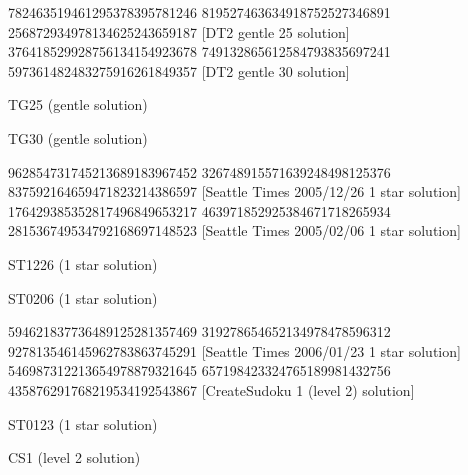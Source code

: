 \documentclass[twoside]{article}
\begin{document}
\renewcommand*{\puzzlefile}{tg25.ans}
\writepuzzle%
{782463519}{461295378}{395781246}%
{819527463}{634918752}{527346891}%
{256872934}{978134625}{243659187}%
[DT2 gentle 25 solution]
\renewcommand*{\puzzlefile}{tg30.ans}
\writepuzzle%
{376418529}{928756134}{154923678}%
{749132865}{612584793}{835697241}%
{597361482}{483275916}{261849357}%
[DT2 gentle 30 solution]
\vfill
\noindent\begin{minipage}{0.47\linewidth}\begin{center}
TG25 (gentle solution) \\
\end{center}\end{minipage}
\hfill
\begin{minipage}{0.47\linewidth}\begin{center}
TG30 (gentle solution) \\
\end{center}\end{minipage}

\renewcommand*{\puzzlefile}{st1226.ans}
\writepuzzle%
{962854731}{745213689}{183967452}%
{326748915}{571639248}{498125376}%
{837592164}{659471823}{214386597}%
[Seattle Times 2005/12/26 1 star solution]
\renewcommand*{\puzzlefile}{st0206.ans}
\writepuzzle%
{176429385}{352817496}{849653217}%
{463971852}{925384671}{718265934}%
{281536749}{534792168}{697148523}%
[Seattle Times 2005/02/06 1 star solution]
\vfill
\noindent\begin{minipage}{0.47\linewidth}\begin{center}
ST1226 (1 star solution) \\
\end{center}\end{minipage}
\hfill
\begin{minipage}{0.47\linewidth}\begin{center}
ST0206 (1 star solution) \\
\end{center}\end{minipage}

\renewcommand*{\puzzlefile}{st0123.ans}
\writepuzzle%
{594621837}{736489125}{281357469}%
{319278654}{652134978}{478596312}%
{927813546}{145962783}{863745291}%
[Seattle Times 2006/01/23 1 star solution]
\renewcommand*{\puzzlefile}{cs1.ans}
\writepuzzle%
{546987312}{213654978}{879321645}%
{657198423}{324765189}{981432756}%
{435876291}{768219534}{192543867}%
[CreateSudoku 1 (level 2) solution]
\vfill
\noindent\begin{minipage}{0.47\linewidth}\begin{center}
ST0123 (1 star solution) \\
\end{center}\end{minipage}
\hfill
\begin{minipage}{0.47\linewidth}\begin{center}
CS1 (level 2 solution) \\
\end{center}\end{minipage}
\end{document}
